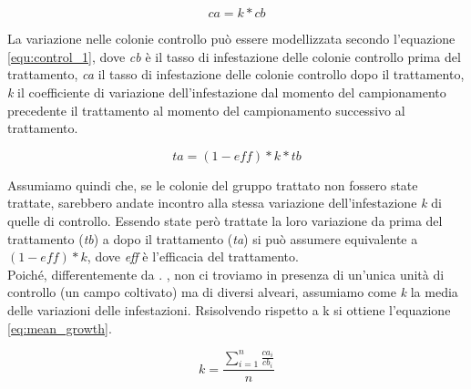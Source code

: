 \documentclass[a4paper,11pt]{article}
\title{}
\author{}
\begin{document}
\maketitle
\tableofcontents

\begin{abstract}
\end{abstract}

\section{}

\begin{center}
\begin{equation}
ca = k*cb
\label{equ:control_1}
\end{equation}
\end{center}
La variazione nelle colonie controllo può essere modellizzata secondo l'equazione \ref{equ:control_1}, dove \textit{cb} è il tasso di infestazione delle colonie controllo prima del trattamento, \textit{ca} il tasso di infestazione delle colonie controllo dopo il trattamento, \textit{k} il coefficiente di variazione dell'infestazione dal momento del campionamento precedente il trattamento al momento del campionamento successivo al trattamento.
\begin{center}
\begin{equation}
ta = (1-eff)*k*tb
\label{equ:treat_1}
\end{equation}
\end{center}
Assumiamo quindi che, se le colonie del gruppo trattato non fossero state trattate, sarebbero andate incontro alla stessa variazione dell'infestazione \textit{k} di quelle di controllo. Essendo state però trattate la loro variazione da prima del trattamento (\textit{tb}) a dopo il trattamento (\textit{ta}) si può assumere equivalente a \begin{math}(1 - {eff})*k\end{math}, dove \textit{eff} è l'efficacia del trattamento.\\
Poiché, differentemente da \citet{henderson_tests_1955}.
, non ci troviamo in presenza di un'unica unità di controllo (un campo coltivato) ma di diversi alveari, assumiamo come \textit{k} la media delle variazioni delle infestazioni. Rsisolvendo rispetto a k si ottiene l'equazione \ref{eq:mean_growth}.
\begin{center}
\begin{equation}
k = \frac{\sum_{i=1}^{n} \frac{ca_i}{cb_i}}{n}
\label{eq:mean_growth}
\end{equation}
\end{center}
\end{document}
